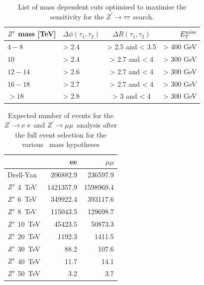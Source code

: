 \documentclass{cernrep}
\newcommand*{\Zptata}{\ensuremath{Z^{\prime}\rightarrow \tau\tau}}
\newcommand*{\Zpee}{\ensuremath{Z^{\prime}\rightarrow \text{e e}}}
\newcommand*{\Zpmumu}{\ensuremath{Z^{\prime}\rightarrow \mu\mu}}
\newcommand*{\met}{\ensuremath{E_{T}^{\rm{miss}}}}
\begin{document}
\begin{table}[htbp]
   \centering
\begin{tabular}{|l|l|c|r|}
  \hline
  \hline
   $Z^{\prime}$ mass [TeV] &  $\Delta \phi(\tau_1, \tau_2)$&  $\Delta R(\tau_1, \tau_2)$ & $\met$\\
  \hline
  $4-8$ & > 2.4 & > 2.5 and < 3.5 & > 400 GeV\\
  $10$ & > 2.4 & > 2.7 and < 4 & > 300 GeV\\
  $12-14$ & > 2.6 & > 2.7 and < 4 & > 300 GeV\\
  $16-18$ & > 2.7 & > 2.7 and < 4 & > 300 GeV\\
  $>18$ & > 2.8 & > 3 and < 4 & > 300 GeV\\
  \hline
  \hline
  \end{tabular}
  \caption{List of mass dependent cuts optimised to maximise the sensitivity for the \Zptata\ search.}
  \label{tab:leptonicresonances:selectiontautau}
\end{table}

\begin{table}[htbp]
   \centering
\begin{tabular}{|l|r|r|}
  \hline
  \hline
 & ee & $\mu\mu$  \\
  \hline
  Drell-Yan & 206882.9 & 236597.9 \\
  \hline
  $Z^{\prime}$ 4~TeV & 1421357.9    & 1598969.4 \\
  $Z^{\prime}$ 6~TeV & 349922.4  & 393117.6\\
  $Z^{\prime}$ 8~TeV &   115043.5 & 129698.7 \\
  $Z^{\prime}$ 10~TeV &  45423.5 & 50873.3 \\
  $Z^{\prime}$ 20~TeV &  1192.3 & 1411.5\\
  $Z^{\prime}$ 30~TeV &  88.2 & 107.6\\
  $Z^{\prime}$ 40~TeV &  11.7 & 14.1 \\
  $Z^{\prime}$ 50~TeV &  3.2 & 3.7\\
  \hline
  \hline
\end{tabular}
  \caption{Expected number of events for the \Zpee\ and \Zpmumu\ analysis after the full event selection for the various \Zp\ mass hypotheses}
  \label{tab:leptonicresonances:yieldsll}
\end{table}
\end{document}
